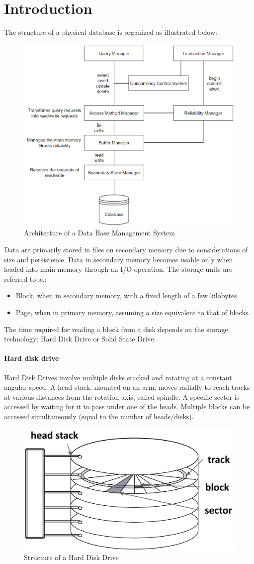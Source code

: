 \section{Introduction}

The structure of a physical database is organized as illustrated below:
\begin{figure}[H]
    \centering
    \includegraphics[width=0.5\linewidth]{images/structure.png}
    \caption{Architecture of a Data Base Management System}
\end{figure} 

Data are primarily stored in files on secondary memory due to considerations of size and persistence.
Data in secondary memory becomes usable only when loaded into main memory through an I/O operation.
The storage units are referred to as:
\begin{itemize}
    \item Block, when in secondary memory, with a fixed length of a few kilobytes.
    \item Page, when in primary memory, assuming a size equivalent to that of blocks.
\end{itemize}
The time required for reading a block from a disk depends on the storage technology: Hard Disk Drive or Solid State Drive.

\paragraph*{Hard disk drive}
Hard Disk Drives involve multiple disks stacked and rotating at a constant angular speed.
A head stack, mounted on an arm, moves radially to reach tracks at various distances from the rotation axis, called spindle.
A specific sector is accessed by waiting for it to pass under one of the heads.
Multiple blocks can be accessed simultaneously (equal to the number of heads/disks).
\begin{figure}[H]
    \centering
    \includegraphics[width=0.35\linewidth]{images/hdd.png}
    \caption{Structure of a Hard Disk Drive}
\end{figure} 

